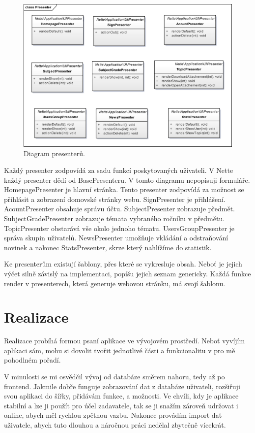 \documentclass[thesis=B,czech]{FITthesis}[2012/06/26]
\begin{document}
\begin{figure}
  \centering
	\includegraphics[scale=0.8]{presentery.png}
	\caption{Diagram presenterů.} \label{fig:presentery} 
\end{figure}

Každý presenter zodpovídá za sadu funkcí poskytovaných uživateli. V Nette každý presenter dědí od BasePresenteru. V tomto diagramu nepopisuji formuláře. HomepagePresenter je hlavní stránka. Tento presenter zodpovídá za možnost se přihlásit a zobrazení domovské stránky webu. SignPresenter je přihlášení. AcountPresenter obsahuje správu účtu. SubjectPresenter zobrazuje předmět. SubjectGradePresenter zobrazuje témata vybraného ročníku v předmětu. TopicPresenter obstarává vše okolo jednoho tématu. UsersGroupPresenter je správa skupin uživatelů. NewsPresenter umožňuje vkládání a odstraňování novinek a nakonec StatsPresenter, skrze který nahlížíme do statistik.

Ke presenterům existují šablony, přes které se vykresluje obsah. Neboť je jejich výčet silně závislý na implementaci, popíšu jejich seznam genericky. Každá funkce render v presenterech, která generuje webovou stránku, má svojí šablonu.

\chapter{Realizace}

Realizace probíhá formou psaní aplikace ve vývojovém prostředí. Neboť vyvíjím aplikaci sám, mohu si dovolit tvořit jednotlivé části a funkcionalitu v pro mě pohodlném pořadí.

V minulosti se mi osvědčil vývoj od databáze směrem nahoru, tedy až po frontend. Jakmile dobře funguje zobrazování dat z databáze uživateli, rozšiřuji svou aplikaci do šířky, přidávám funkce, a možnosti. Ve chvíli, kdy je aplikace stabilní a lze ji použít pro účel zadavatele, tak se ji snažím zároveň udržovat i online, abych měl rychlou zpětnou vazbu. Nakonec provádím import dat uživatele, abych tuto dlouhou a náročnou práci nedělal zbytečně vícekrát.
\end{document}
